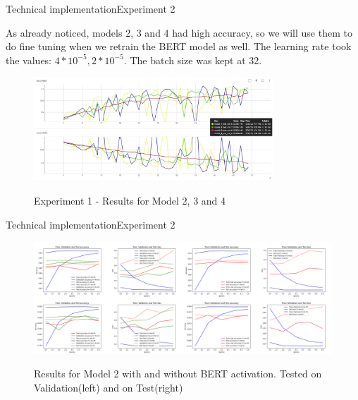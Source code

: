 \documentclass[
]{beamer}
\begin{document}
\begin{frame}{Technical implementation}{Experiment 2}

\hspace{0.4cm}  As already noticed, models 2, 3 and 4 had high accuracy, so we will use them to do fine tuning when we retrain the BERT model as well. The learning rate took the values: $4*10^{-5}, 2*10^{-5}$. The batch size was kept at 32.

\begin{center}
    \begin{figure}[!h]
        \centering
        \includegraphics[width=0.8\textwidth]{img/exp1_hiperparametrizare.jpg}
        \label{fig:exp1_hiperm}
        \caption{Experiment 1 - Results for Model 2, 3 and 4}
    \end{figure}
\end{center}

\end{frame}



\begin{frame}{Technical implementation}{Experiment 2}

\begin{center}
    \begin{figure}[!h]
        \centering
        \includegraphics[width=\textwidth]{img/ger_model1.png}
        \label{fig:ger_model1}
        \caption{Results for Model 2 with and without BERT activation. Tested on Validation(left) and on Test(right)}
    \end{figure}
\end{center}

\end{frame}
\end{document}
